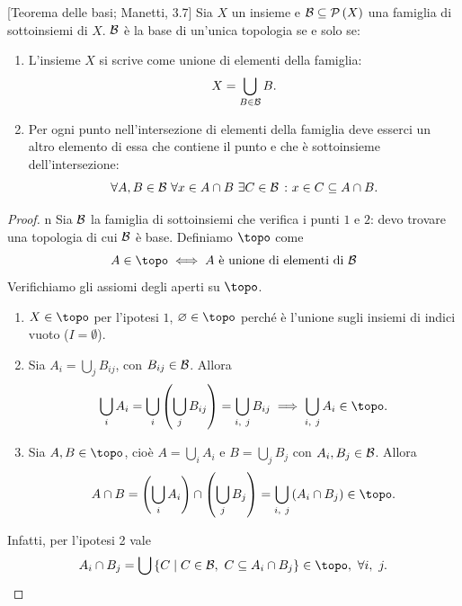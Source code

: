 \begin{theorem}{}[Teorema delle basi; Manetti, 3.7]\label{teoremabasi}
Sia $X$ un insieme e $\mathcal{B}\subseteq\mathcal{P}\left(X\right)$ una famiglia di sottoinsiemi di $X$. $\mathcal{B}$ è la base di un'unica topologia se e solo se:
\begin{enumerate}
\item L'insieme $X$ si scrive come unione di elementi della famiglia:
\begin{equation*}
	 X=\bigcup_{B\in \mathcal{B}}B.
\end{equation*}
\item Per ogni punto nell'intersezione di elementi della famiglia deve esserci un altro elemento di essa che contiene il punto e che è sottoinsieme dell'intersezione:
\begin{equation*}
	\forall A, B\in\mathcal{B}\ \forall x\in A\cap B\ \exists C\in \mathcal{B}\ \colon x\in C\subseteq A\cap B.
\end{equation*}
\end{enumerate}
\end{theorem}
\begin{proof}{n}
Sia $\mathcal{B}$ la famiglia di sottoinsiemi che verifica i punti $1$ e $2$: devo trovare una topologia di cui $\mathcal{B}$ è base. Definiamo $\topo$ come
\begin{equation*}
A\in\topo\iff A\text{ è unione di elementi di }\basis
\end{equation*}
Verifichiamo gli assiomi degli aperti su $\topo$.
\begin{enumerate}[label=\Roman*]
\item $X\in\topo$ per l'ipotesi $1$, $\emptyset\in\topo$ perché è l'unione sugli insiemi di indici vuoto ($I=\emptyset$).
\item Sia $\displaystyle A_i=\bigcup_{j}B_{ij}$, con $B_{ij}\in\mathcal{B}$. Allora
\begin{equation*}
\bigcup_{i}A_i=\bigcup_{i}\left(\bigcup_{j}B_{ij}\right)=\bigcup_{i,\ j}B_{ij}\implies\bigcup_{i,\ j}A_i\in\topo.
\end{equation*}
\item Sia $A, B\in\topo$, cioè $\displaystyle A=\bigcup_{i}A_i$ e $\displaystyle B=\bigcup_{j}B_j$ con $A_i, B_j\in\mathcal{B}$. Allora
\begin{equation*}
A\cap B=\left(\bigcup_{i}A_i\right)\cap\left(\bigcup_{j}B_j\right)=\bigcup_{i,\ j}\left(A_i\cap B_j\right)\in\topo.
\end{equation*}
\end{enumerate}
Infatti, per l'ipotesi 2 vale 
\begin{equation*}
	A_i\cap B_j=\bigcup\left\{C\middle| C\in\basis,\ C\subseteq A_i\cap B_j\right\}\in \topo,\ \forall i,\ j.\qedhere
\end{equation*}
\end{proof}
